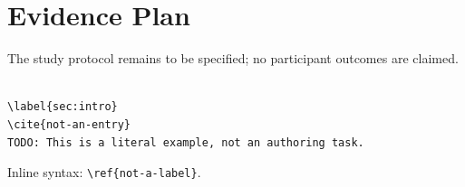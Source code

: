 \section{Evidence Plan}\label{sec:method}
The study protocol remains to be specified; no participant outcomes are claimed.
\begin{verbatim}

\label{sec:intro}
\cite{not-an-entry}
TODO: This is a literal example, not an authoring task.
\end{verbatim}
Inline syntax: \verb|\ref{not-a-label}|.
